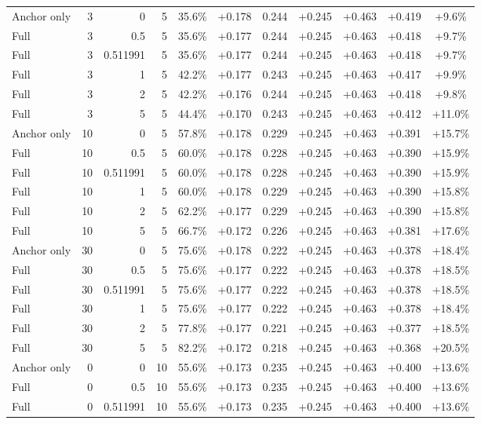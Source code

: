 \begin{table}[htbp]
\begin{tabular}{lrrrccccccc}
Anchor only & 3 & 0 & 5 & 35.6\% & +0.178 & 0.244 & +0.245 & +0.463 & +0.419 & +9.6\% \\
Full & 3 & 0.5 & 5 & 35.6\% & +0.177 & 0.244 & +0.245 & +0.463 & +0.418 & +9.7\% \\
Full & 3 & 0.511991 & 5 & 35.6\% & +0.177 & 0.244 & +0.245 & +0.463 & +0.418 & +9.7\% \\
Full & 3 & 1 & 5 & 42.2\% & +0.177 & 0.243 & +0.245 & +0.463 & +0.417 & +9.9\% \\
Full & 3 & 2 & 5 & 42.2\% & +0.176 & 0.244 & +0.245 & +0.463 & +0.418 & +9.8\% \\
Full & 3 & 5 & 5 & 44.4\% & +0.170 & 0.243 & +0.245 & +0.463 & +0.412 & +11.0\% \\
Anchor only & 10 & 0 & 5 & 57.8\% & +0.178 & 0.229 & +0.245 & +0.463 & +0.391 & +15.7\% \\
Full & 10 & 0.5 & 5 & 60.0\% & +0.178 & 0.228 & +0.245 & +0.463 & +0.390 & +15.9\% \\
Full & 10 & 0.511991 & 5 & 60.0\% & +0.178 & 0.228 & +0.245 & +0.463 & +0.390 & +15.9\% \\
Full & 10 & 1 & 5 & 60.0\% & +0.178 & 0.229 & +0.245 & +0.463 & +0.390 & +15.8\% \\
Full & 10 & 2 & 5 & 62.2\% & +0.177 & 0.229 & +0.245 & +0.463 & +0.390 & +15.8\% \\
Full & 10 & 5 & 5 & 66.7\% & +0.172 & 0.226 & +0.245 & +0.463 & +0.381 & +17.6\% \\
Anchor only & 30 & 0 & 5 & 75.6\% & +0.178 & 0.222 & +0.245 & +0.463 & +0.378 & +18.4\% \\
Full & 30 & 0.5 & 5 & 75.6\% & +0.177 & 0.222 & +0.245 & +0.463 & +0.378 & +18.5\% \\
Full & 30 & 0.511991 & 5 & 75.6\% & +0.177 & 0.222 & +0.245 & +0.463 & +0.378 & +18.5\% \\
Full & 30 & 1 & 5 & 75.6\% & +0.177 & 0.222 & +0.245 & +0.463 & +0.378 & +18.4\% \\
Full & 30 & 2 & 5 & 77.8\% & +0.177 & 0.221 & +0.245 & +0.463 & +0.377 & +18.5\% \\
Full & 30 & 5 & 5 & 82.2\% & +0.172 & 0.218 & +0.245 & +0.463 & +0.368 & +20.5\% \\
Anchor only & 0 & 0 & 10 & 55.6\% & +0.173 & 0.235 & +0.245 & +0.463 & +0.400 & +13.6\% \\
Full & 0 & 0.5 & 10 & 55.6\% & +0.173 & 0.235 & +0.245 & +0.463 & +0.400 & +13.6\% \\
Full & 0 & 0.511991 & 10 & 55.6\% & +0.173 & 0.235 & +0.245 & +0.463 & +0.400 & +13.6\% \\

\end{tabular}
\end{table}

